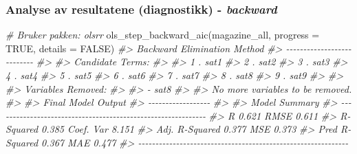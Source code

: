 \documentclass[
]{article}
\newenvironment{Shaded}{\begin{snugshade}}{\end{snugshade}}
\newcommand{\AttributeTok}[1]{\textcolor[rgb]{0.77,0.63,0.00}{#1}}
\newcommand{\CommentTok}[1]{\textcolor[rgb]{0.56,0.35,0.01}{\textit{#1}}}
\newcommand{\ConstantTok}[1]{\textcolor[rgb]{0.00,0.00,0.00}{#1}}
\newcommand{\FunctionTok}[1]{\textcolor[rgb]{0.00,0.00,0.00}{#1}}
\newcommand{\NormalTok}[1]{#1}
\begin{document}
\hypertarget{analyse-av-resultatene-diagnostikk---backward}{%
\subsubsection{\texorpdfstring{Analyse av resultatene (diagnostikk) - \emph{backward}}{Analyse av resultatene (diagnostikk) - backward}}\label{analyse-av-resultatene-diagnostikk---backward}}

\begin{Shaded}
\begin{Highlighting}[]
\CommentTok{\# Bruker pakken: olsrr}
\FunctionTok{ols\_step\_backward\_aic}\NormalTok{(magazine\_all, }\AttributeTok{progress =} \ConstantTok{TRUE}\NormalTok{, }\AttributeTok{details =} \ConstantTok{FALSE}\NormalTok{)}
\CommentTok{\#\textgreater{} Backward Elimination Method }
\CommentTok{\#\textgreater{} {-}{-}{-}{-}{-}{-}{-}{-}{-}{-}{-}{-}{-}{-}{-}{-}{-}{-}{-}{-}{-}{-}{-}{-}{-}{-}{-}}
\CommentTok{\#\textgreater{} }
\CommentTok{\#\textgreater{} Candidate Terms: }
\CommentTok{\#\textgreater{} }
\CommentTok{\#\textgreater{} 1 . sat1 }
\CommentTok{\#\textgreater{} 2 . sat2 }
\CommentTok{\#\textgreater{} 3 . sat3 }
\CommentTok{\#\textgreater{} 4 . sat4 }
\CommentTok{\#\textgreater{} 5 . sat5 }
\CommentTok{\#\textgreater{} 6 . sat6 }
\CommentTok{\#\textgreater{} 7 . sat7 }
\CommentTok{\#\textgreater{} 8 . sat8 }
\CommentTok{\#\textgreater{} 9 . sat9 }
\CommentTok{\#\textgreater{} }
\CommentTok{\#\textgreater{} }
\CommentTok{\#\textgreater{} Variables Removed: }
\CommentTok{\#\textgreater{} }
\CommentTok{\#\textgreater{} {-} sat8 }
\CommentTok{\#\textgreater{} }
\CommentTok{\#\textgreater{} No more variables to be removed.}
\CommentTok{\#\textgreater{} }
\CommentTok{\#\textgreater{} Final Model Output }
\CommentTok{\#\textgreater{} {-}{-}{-}{-}{-}{-}{-}{-}{-}{-}{-}{-}{-}{-}{-}{-}{-}{-}}
\CommentTok{\#\textgreater{} }
\CommentTok{\#\textgreater{}                         Model Summary                         }
\CommentTok{\#\textgreater{} {-}{-}{-}{-}{-}{-}{-}{-}{-}{-}{-}{-}{-}{-}{-}{-}{-}{-}{-}{-}{-}{-}{-}{-}{-}{-}{-}{-}{-}{-}{-}{-}{-}{-}{-}{-}{-}{-}{-}{-}{-}{-}{-}{-}{-}{-}{-}{-}{-}{-}{-}{-}{-}{-}{-}{-}{-}{-}{-}{-}{-}}
\CommentTok{\#\textgreater{} R                       0.621       RMSE               0.611 }
\CommentTok{\#\textgreater{} R{-}Squared               0.385       Coef. Var          8.151 }
\CommentTok{\#\textgreater{} Adj. R{-}Squared          0.377       MSE                0.373 }
\CommentTok{\#\textgreater{} Pred R{-}Squared          0.367       MAE                0.477 }
\CommentTok{\#\textgreater{} {-}{-}{-}{-}{-}{-}{-}{-}{-}{-}{-}{-}{-}{-}{-}{-}{-}{-}{-}{-}{-}{-}{-}{-}{-}{-}{-}{-}{-}{-}{-}{-}{-}{-}{-}{-}{-}{-}{-}{-}{-}{-}{-}{-}{-}{-}{-}{-}{-}{-}{-}{-}{-}{-}{-}{-}{-}{-}{-}{-}{-}}

\end{Highlighting}
\end{Shaded}
\end{document}
